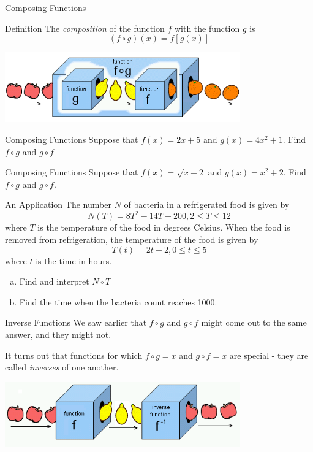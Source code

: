 \documentclass{beamer}
\newcommand{\fb}[1]{\left[{#1}\right]} %
\begin{document}
\begin{frame}[t]{Composing Functions}
\begin{block}{Definition}
The \textit{composition} of the function $f$ with the function $g$ is \vspace{-8pt} $$(f\circ g)(x) = f\fb{g(x)}$$ \vspace{-8pt}
\end{block}

\pause

\includegraphics[width=4in]{CompIllustration.png}
\end{frame}

\begin{frame}[t]{Composing Functions}
Suppose that $f(x) = 2x + 5$ and $g(x) = 4x^2 + 1$. Find $f\circ g$ and $g\circ f$
\end{frame}

\begin{frame}[t]{Composing Functions}
Suppose that $f(x) = \sqrt{x-2}$ and $g(x) = x^2 + 2$. Find $f\circ g$ and $g\circ f$.
\end{frame}

\begin{frame}[t]{An Application}
The number $N$ of bacteria in a refrigerated food is given by $$N(T) = 8T^2 - 14T + 200, 2\leq T\leq 12$$ where $T$ is the temperature of the food in degrees Celsius. When the food is removed from refrigeration, the temperature of the food is given by $$T(t) = 2t+2, 0\leq t \leq 5$$ where $t$ is the time in hours. \begin{enumerate}[(a)]
\item Find and interpret $N\circ T$
\item Find the time when the bacteria count reaches 1000.
\end{enumerate}
\end{frame}

\begin{frame}[t]{Inverse Functions}
We saw earlier that $f\circ g$ and $g\circ f$ might come out to the same answer, and they might not.

\pause

It turns out that functions for which $f\circ g = x$ and $g\circ f = x$ are special - they are called \textit{inverses} of one another. \vspace{12pt}

\pause

\includegraphics[width=4in]{InvIllustration.png}
\end{frame}
\end{document}
